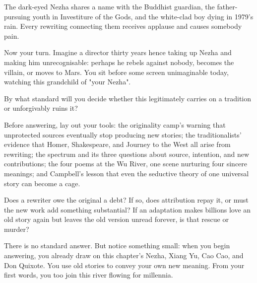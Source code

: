 The dark-eyed Nezha shares a name with the Buddhist guardian, the father-pursuing youth in Investiture of the Gods, and the white-clad boy dying in 1979's rain. Every rewriting connecting them receives applause and causes somebody pain.

Now your turn. Imagine a director thirty years hence taking up Nezha and making him unrecognisable: perhaps he rebels against nobody, becomes the villain, or moves to Mars. You sit before some screen unimaginable today, watching this grandchild of "your Nezha".

By what standard will you decide whether this legitimately carries on a tradition or unforgivably ruins it?

Before answering, lay out your tools: the originality camp's warning that unprotected sources eventually stop producing new stories; the traditionalists' evidence that Homer, Shakespeare, and Journey to the West all arise from rewriting; the spectrum and its three questions about source, intention, and new contributions; the four poems at the Wu River, one scene nurturing four sincere meanings; and Campbell's lesson that even the seductive theory of one universal story can become a cage.

Does a rewriter owe the original a debt? If so, does attribution repay it, or must the new work add something substantial? If an adaptation makes billions love an old story again but leaves the old version unread forever, is that rescue or murder?

There is no standard answer. But notice something small: when you begin answering, you already draw on this chapter's Nezha, Xiang Yu, Cao Cao, and Don Quixote. You use old stories to convey your own new meaning. From your first words, you too join this river flowing for millennia.
